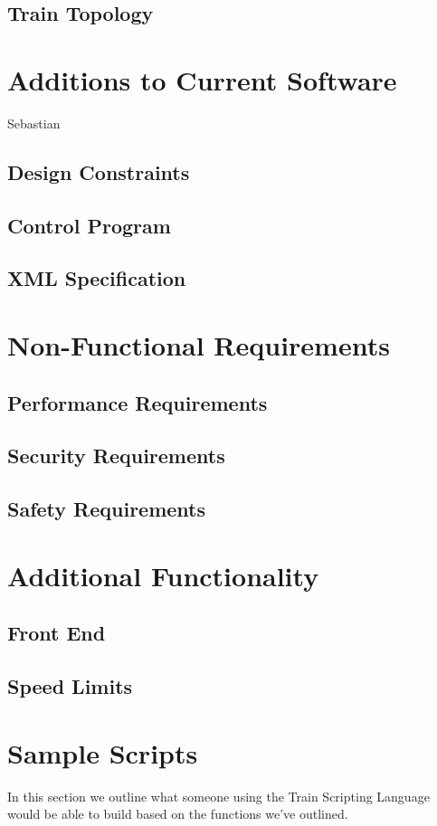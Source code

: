 \documentclass[a4paper,11pt,notitlepage]{article}
\def\TSL{Train Scripting Language\xspace}
\begin{document}
\subsection{Train Topology}

\section{Additions to Current Software}
Sebastian
\subsection{Design Constraints}
\subsection{Control Program}
\subsection{XML Specification}

\section{Non-Functional Requirements}
\subsection{Performance Requirements}
\subsection{Security Requirements}
\subsection{Safety Requirements}

\section{Additional Functionality}
\subsection{Front End}
\subsection{Speed Limits}

\section{Sample Scripts}
In this section we outline what someone using the \TSL would be able to build based on the functions we've outlined.
\end{document}
